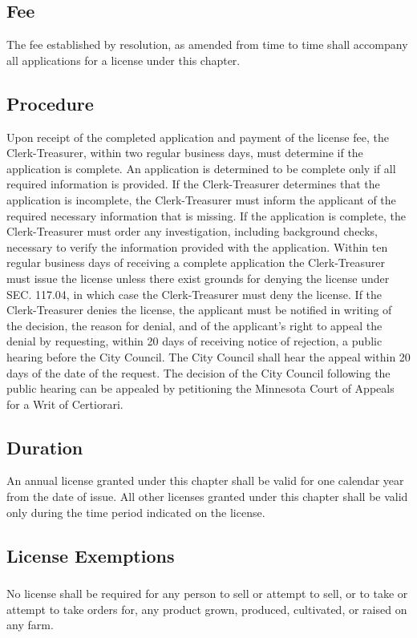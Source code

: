 \subsection{Fee}
The fee established by resolution, as amended from time to time shall accompany all applications for a license under this chapter.
\subsection{Procedure}
Upon receipt of the completed application and payment of the license fee, the Clerk-Treasurer, within two regular business days, must determine if the application is complete. An application is determined to be complete only if all required information is provided. If the Clerk-Treasurer determines that the application is incomplete, the Clerk-Treasurer must inform the applicant of the required necessary information that is missing. If the application is complete, the Clerk-Treasurer must order any investigation, including background checks, necessary to verify the information provided with the application. Within ten regular business days of receiving a complete application the Clerk-Treasurer must issue the license unless there exist grounds for denying the license under SEC. 117.04, in which case the Clerk-Treasurer must deny the license. If the Clerk-Treasurer denies the license, the applicant must be notified in writing of the decision, the reason for denial, and of the applicant’s right to appeal the denial by requesting, within 20 days of receiving notice of rejection, a public hearing before the City Council. The City Council shall hear the appeal within 20 days of the date of the request. The decision of the City Council following the public hearing can be appealed by petitioning the Minnesota Court of Appeals for a Writ of Certiorari.
\subsection{Duration}
An annual license granted under this chapter shall be valid for one calendar year from the date of issue. All other licenses granted under this chapter shall be valid only during the time period indicated on the license.
\subsection{License Exemptions}
\subsubsection{}
No license shall be required for any person to sell or attempt to sell, or to take or attempt to take orders for, any product grown, produced, cultivated, or raised on any farm.
